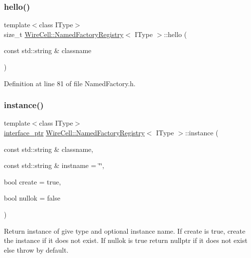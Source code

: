 \subsubsection{\texorpdfstring{hello()}{hello()}}
{\footnotesize\ttfamily template$<$class I\+Type$>$ \\
size\+\_\+t \hyperlink{class_wire_cell_1_1_named_factory_registry}{Wire\+Cell\+::\+Named\+Factory\+Registry}$<$ I\+Type $>$\+::hello (\begin{DoxyParamCaption}\item[{const std\+::string \&}]{classname }\end{DoxyParamCaption})\hspace{0.3cm}{\ttfamily [inline]}}



Definition at line 81 of file Named\+Factory.\+h.

\mbox{\label{class_wire_cell_1_1_named_factory_registry_a81b540cbf24b04c728ad24a7e0af6c2e}} 
\subsubsection{\texorpdfstring{instance()}{instance()}}
{\footnotesize\ttfamily template$<$class I\+Type$>$ \\
\hyperlink{class_wire_cell_1_1_named_factory_registry_a1098a42a84d98eae7cdb3cc9a0602e38}{interface\+\_\+ptr} \hyperlink{class_wire_cell_1_1_named_factory_registry}{Wire\+Cell\+::\+Named\+Factory\+Registry}$<$ I\+Type $>$\+::instance (\begin{DoxyParamCaption}\item[{const std\+::string \&}]{classname,  }\item[{const std\+::string \&}]{instname = {\ttfamily \char`\"{}\char`\"{}},  }\item[{bool}]{create = {\ttfamily true},  }\item[{bool}]{nullok = {\ttfamily false} }\end{DoxyParamCaption})\hspace{0.3cm}{\ttfamily [inline]}}

Return instance of give type and optional instance name. If create is true, create the instance if it does not exist. If nullok is true return nullptr if it does not exist else throw by default. 

